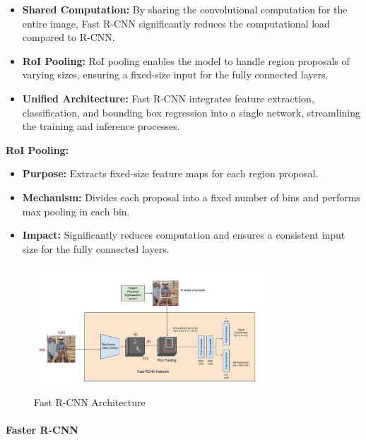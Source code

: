 \documentclass[12pt]{article}
\begin{document}
\begin{itemize}
    \item \textbf{Shared Computation:} By sharing the convolutional computation for the entire image, Fast R-CNN significantly reduces the computational load compared to R-CNN.
    
    \item \textbf{RoI Pooling:} RoI pooling enables the model to handle region proposals of varying sizes, ensuring a fixed-size input for the fully connected layers.

    \item \textbf{Unified Architecture:} Fast R-CNN integrates feature extraction, classification, and bounding box regression into a single network, streamlining the training and inference processes.
\end{itemize}

\textbf{RoI Pooling:}
\begin{itemize}
    \item \textbf{Purpose:} Extracts fixed-size feature maps for each region proposal.
    \item \textbf{Mechanism:} Divides each proposal into a fixed number of bins and performs max pooling in each bin.
    \item \textbf{Impact:} Significantly reduces computation and ensures a consistent input size for the fully connected layers.
\end{itemize}

\begin{figure}[h]
    \centering
    \includegraphics[width=0.8\textwidth]{./media/fast-rcnn.jpeg}
    \caption{Fast R-CNN Architecture}
    \label{fig:fast_rcnn}
\end{figure}

\paragraph{Faster R-CNN}
\end{document}
